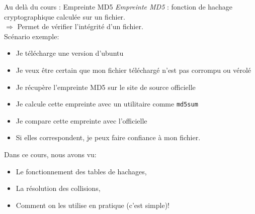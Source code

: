 \documentclass[12pt,a4paper]{beamer}
\begin{document}
\begin{frame}{Au delà du cours : Empreinte MD5}
\emph{Empreinte MD5} : fonction de hachage cryptographique calculée sur un fichier.\\
$\Rightarrow$ Permet de vérifier l'intégrité d'un fichier.\\
Scénario exemple:

\begin{itemize}
\item Je télécharge une version d'ubuntu
\item Je veux être certain que mon fichier téléchargé n'est pas corrompu ou vérolé
\item Je récupère l'empreinte MD5 sur le site de source officielle
\item Je calcule cette empreinte avec un utilitaire comme \texttt{md5sum}
\item Je compare cette empreinte avec l'officielle
\item Si elles correspondent, je peux faire confiance à mon fichier.
\end{itemize}

\end{frame}



\begin{frame}
Dans ce cours, nous avons vu:
\begin{itemize}
\item Le fonctionnement des tables de hachages,
\item La résolution des collisions,
\item Comment on les utilise en pratique (c'est simple)!
\end{itemize}
\end{frame}
\end{document}
